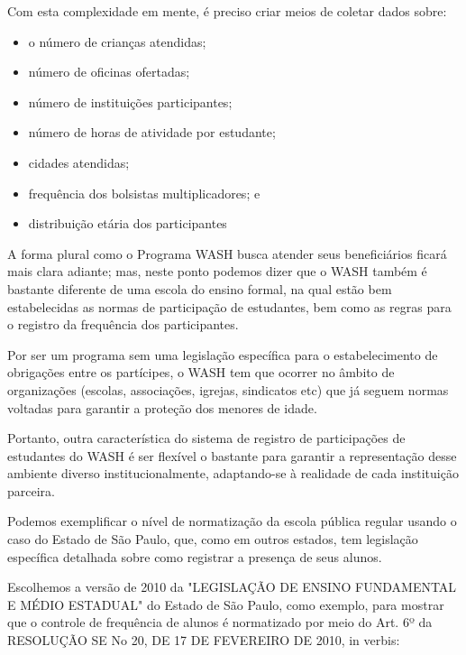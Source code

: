 Com esta complexidade em mente, é preciso criar meios de coletar dados sobre:


\begin{itemize}
\item o número de crianças atendidas;
\item número de oficinas ofertadas;
\item número de instituições participantes;
\item número de horas de atividade por estudante;
\item cidades atendidas;
\item frequência dos bolsistas multiplicadores; e
\item distribuição etária dos participantes
\end{itemize}



A forma plural como o Programa WASH busca atender seus beneficiários ficará mais clara adiante; mas, neste ponto podemos dizer que o WASH também é bastante diferente de uma escola do ensino formal, na qual estão bem estabelecidas as normas de participação de estudantes, bem como as regras para o registro da frequência dos participantes.

Por ser um programa sem uma legislação específica para o estabelecimento de obrigações entre os partícipes, o WASH tem que ocorrer no âmbito de organizações (escolas, associações, igrejas, sindicatos etc) que já seguem normas voltadas para garantir a proteção dos menores de idade.

Portanto, outra característica do sistema de registro de participações de estudantes do WASH é ser flexível o bastante para garantir a representação desse ambiente diverso institucionalmente, adaptando-se à realidade de cada instituição parceira.

Podemos exemplificar o nível de normatização da escola pública regular usando o caso do Estado de São Paulo, que, como em outros estados, tem legislação específica detalhada sobre como registrar a presença de seus alunos.

Escolhemos a versão de 2010 da "LEGISLAÇÃO DE ENSINO FUNDAMENTAL E MÉDIO ESTADUAL" do Estado de São Paulo, como exemplo, para mostrar que o controle de frequência de alunos é normatizado por meio do Art. 6º da RESOLUÇÃO SE No 20, DE 17 DE FEVEREIRO DE 2010, in verbis:


\noindent\begin{center}\mbox{\centering{}}\end{center}


